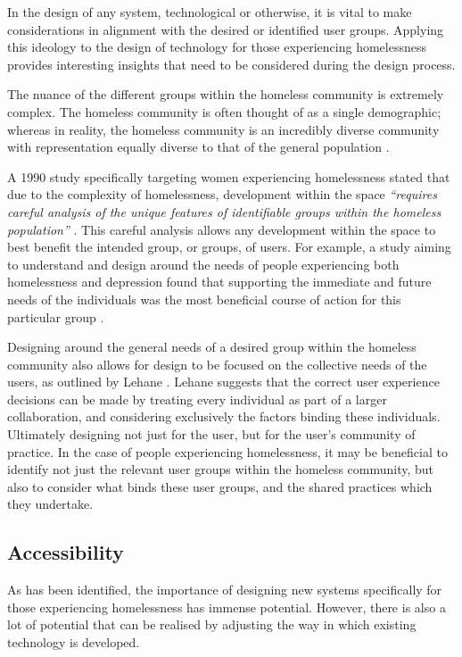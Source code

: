 In the design of any system, technological or otherwise, it is vital to make considerations in alignment with the desired or identified user groups. Applying this ideology to the design of technology for those experiencing homelessness provides interesting insights that need to be considered during the design process.

The nuance of the different groups within the homeless community is extremely complex. The homeless community is often thought of as a single demographic; whereas in reality, the homeless community is an incredibly diverse community with representation equally diverse to that of the general population \cite{abs2016census}.

A 1990 study specifically targeting women experiencing homelessness stated that due to the complexity of homelessness, development within the space \emph{“requires careful analysis of the unique features of identifiable groups within the homeless population”} \cite[p.~1]{hagen1990designing}. This careful analysis allows any development within the space to best benefit the intended group, or groups, of users. For example, a study aiming to understand and design around the needs of people experiencing both homelessness and depression found that supporting the immediate and future needs of the individuals was the most beneficial course of action for this particular group \cite{belcher1990needs}.

Designing around the general needs of a desired group within the homeless community also allows for design to be focused on the collective needs of the users, as outlined by Lehane \cite{lehane2010designing}. Lehane suggests that the correct user experience decisions can be made by treating every individual as part of a larger collaboration, and considering exclusively the factors binding these individuals. Ultimately designing not just for the user, but for the user's community of practice. In the case of people experiencing homelessness, it may be beneficial to identify not just the relevant user groups within the homeless community, but also to consider what binds these user groups, and the shared practices which they undertake.

\subsection{Accessibility}

As has been identified, the importance of designing new systems specifically for those experiencing homelessness has immense potential. However, there is also a lot of potential that can be realised by adjusting the way in which existing technology is developed.

